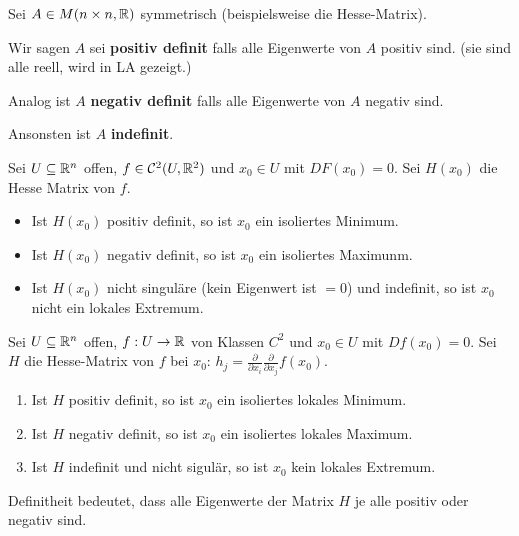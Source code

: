\documentclass[main.tex]{subfiles}
\begin{document}
\begin{Definition}[Definitheit]
  Sei $A \in M(n \times n, \mathbb{R})$ symmetrisch (beispielsweise die Hesse-Matrix).

  Wir sagen $A$ sei \textbf{positiv definit} falls alle Eigenwerte von $A$ positiv sind. (sie sind alle reell, wird in LA gezeigt.)

  Analog ist $A$ \textbf{negativ definit} falls alle Eigenwerte von $A$ negativ sind.

  Ansonsten ist $A$ \textbf{indefinit}.
\end{Definition}

\begin{Theorem}
  Sei $U \subseteq \mathbb{R}^n$ offen, $f \in \mathcal{C}^2 (U,\mathbb{R}^2)$ und $x_0 \in U$ mit $DF(x_0) = 0$. Sei $H(x_0)$ die Hesse Matrix von $f$.
  \begin{itemize}
    \item Ist $H(x_0)$ positiv definit, so ist $x_0$ ein isoliertes Minimum.
    \item Ist $H(x_0)$ negativ definit, so ist $x_0$ ein isoliertes Maximunm.
    \item Ist $H(x_0)$ nicht singuläre (kein Eigenwert ist $=0$) und indefinit, so ist $x_0$ nicht ein lokales Extremum.
  \end{itemize}
\end{Theorem}

\begin{Theorem}
  Sei $U \subseteq \mathbb{R}^n$ offen, $f: U \to \mathbb{R}$ von Klassen $C^2$ und $x_0 \in U$ mit $Df(x_0)= 0$. Sei $H$ die Hesse-Matrix von $f$ bei $x_0$: $h_j = \frac{\partial}{\partial x_i} \frac{\partial}{\partial x_j} f(x_0)$.
  \begin{enumerate}
    \item Ist $H$ positiv definit, so ist $x_0$ ein isoliertes lokales Minimum.
    \item Ist $H$ negativ definit, so ist $x_0$ ein isoliertes lokales Maximum.
    \item Ist $H$ indefinit und nicht sigulär, so ist $x_0$ kein lokales Extremum.
  \end{enumerate}
\end{Theorem}

\begin{Bemerkung}
  Definitheit bedeutet, dass alle Eigenwerte der Matrix $H$ je alle positiv oder negativ sind.
\end{Bemerkung}
\end{document}
